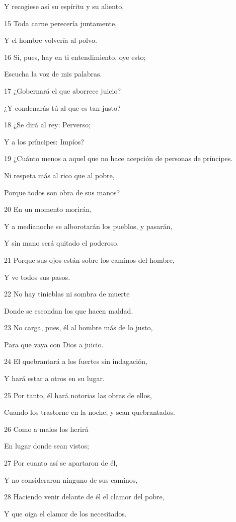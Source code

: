 \par Y recogiese así su espíritu y su aliento,
\par 15 Toda carne perecería juntamente,
\par Y el hombre volvería al polvo.
\par 16 Si, pues, hay en ti entendimiento, oye esto;
\par Escucha la voz de mis palabras.
\par 17 ¿Gobernará el que aborrece juicio?
\par ¿Y condenarás tú al que es tan justo?
\par 18 ¿Se dirá al rey: Perverso;
\par Y a los príncipes: Impíos?
\par 19 ¿Cuánto menos a aquel que no hace acepción de personas de príncipes.
\par Ni respeta más al rico que al pobre,
\par Porque todos son obra de sus manos?
\par 20 En un momento morirán,
\par Y a medianoche se alborotarán los pueblos, y pasarán,
\par Y sin mano será quitado el poderoso.
\par 21 Porque sus ojos están sobre los caminos del hombre,
\par Y ve todos sus pasos.
\par 22 No hay tinieblas ni sombra de muerte
\par Donde se escondan los que hacen maldad.
\par 23 No carga, pues, él al hombre más de lo justo,
\par Para que vaya con Dios a juicio. 
\par 24 El quebrantará a los fuertes sin indagación,
\par Y hará estar a otros en su lugar.
\par 25 Por tanto, él hará notorias las obras de ellos,
\par Cuando los trastorne en la noche, y sean quebrantados.
\par 26 Como a malos los herirá
\par En lugar donde sean vistos;
\par 27 Por cuanto así se apartaron de él,
\par Y no consideraron ninguno de sus caminos,
\par 28 Haciendo venir delante de él el clamor del pobre,
\par Y que oiga el clamor de los necesitados.
